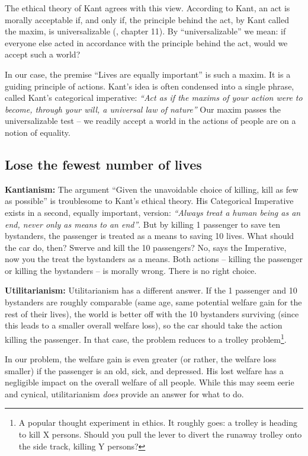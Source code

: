 The ethical theory of Kant agrees with this view. According to Kant, an act is morally acceptable if, and only if, the principle behind the act, by Kant called the maxim, is universalizable (\cite{Schafer}, chapter 11). By “universalizable” we mean: if everyone else acted in accordance with the principle behind the act, would we accept such a world?  

In our case, the premise “Lives are equally important” is such a maxim. It is a guiding principle of actions. Kant’s idea is often condensed into a single phrase, called Kant’s categorical imperative: \textit{“Act as if the maxims of your action were to become, through your will, a universal law of nature”} Our maxim passes the universalizable test – we readily accept a world in the actions of people are on a notion of equality.


\subsection{Lose the fewest number of lives}
\textbf{Kantianism:} The argument “Given the unavoidable choice of killing, kill as few as possible” is troublesome to Kant’s ethical theory. His Categorical Imperative exists in a second, equally important, version: \textit{“Always treat a human being as an end, never only as means to an end”}. But by killing 1 passenger to save ten bystanders, the passenger is treated as a means to saving 10 lives. What should the car do, then? Swerve and kill the 10 passengers? No, says the Imperative, now you the treat the bystanders as a means.
Both actions – killing the passenger or killing the bystanders – is morally wrong. There is no right choice.

\textbf{Utilitarianism:} Utilitarianism has a different answer. If the 1 passenger and 10 bystanders are roughly comparable (same age, same potential welfare gain for the rest of their lives), the world is better off with the 10 bystanders surviving (since this leads to a smaller overall welfare loss), so the car should take the action killing the passenger. In that case, the problem reduces to a trolley problem\footnote{A popular thought experiment in ethics. It roughly goes: a trolley is heading to kill X persons. Should you pull the lever to divert the runaway trolley onto the side track, killing Y persons?}.

In our problem, the welfare gain is even greater (or rather, the welfare loss smaller) if the passenger is an old, sick, and depressed. His lost welfare has a negligible impact on the overall welfare of all people. While this may seem eerie and cynical, utilitarianism \textit{does} provide an answer for what to do. 

